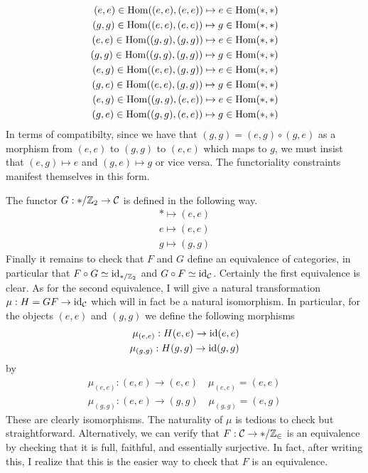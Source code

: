 \documentclass[12pt]{article}
\begin{document}
\begin{align*}
    (e,e)\in \operatorname{Hom}((e,e),(e,e)) \mapsto e \in \operatorname{Hom}(*,*) \\
    (g,g)\in \operatorname{Hom}((e,e),(e,e)) \mapsto g \in \operatorname{Hom}(*,*) \\
    (e,e)\in \operatorname{Hom}((g,g),(g,g)) \mapsto e \in \operatorname{Hom}(*,*) \\
    (g,g)\in \operatorname{Hom}((g,g),(g,g)) \mapsto g \in \operatorname{Hom}(*,*) \\
    (e,g)\in \operatorname{Hom}((e,e),(g,g)) \mapsto e \in \operatorname{Hom}(*,*) \\
    (g,e)\in \operatorname{Hom}((e,e),(g,g)) \mapsto g \in \operatorname{Hom}(*,*) \\
    (e,g)\in \operatorname{Hom}((g,g),(e,e)) \mapsto e \in \operatorname{Hom}(*,*) \\
    (g,e)\in \operatorname{Hom}((g,g),(e,e)) \mapsto g \in \operatorname{Hom}(*,*)
\end{align*} In terms of compatibilty, since we have that $(g,g) = (e,g) \circ (g,e)$ as a morphism from $(e,e)$ to $(g,g)$ to $(e,e)$ which maps to $g$, we must insist that $(e,g) \mapsto e $ and $(g,e) \mapsto g$ or vice versa. The functoriality constraints manifest themselves in this form.

The functor $G:*/\mathbb{Z}_2 \to \cal C$ is defined in the following way. \begin{align*}
    * \mapsto (e,e) \\
    e \mapsto (e,e) \\
    g \mapsto (g,g)
\end{align*} Finally it remains to check that $F$ and $G$ define an equivalence of categories, in particular that $F \circ G \simeq \text{id}_{*/\mathbb{Z}_2}$ and $G \circ F \simeq \text{id}_{\cal C}$. Certainly the first equivalence is clear. As for the second equivalence, I will give a natural transformation $\mu: H = GF \to \text{id}_{\cal C}$ which will in fact be a natural isomorphism. In particular, for the objects $(e,e)$ and $(g,g)$ we define the following morphisms \begin{align*}
    \mu_{(e,e)}: H(e,e) \to \operatorname{id}(e,e) \\
    \mu_{(g,g)}: H(g,g) \to \operatorname{id}(g,g)
\end{align*} by \begin{align*}
    \mu_{(e,e)}: (e,e) \to (e,e) \quad \mu_{(e,e)} = (e,e) \\
    \mu_{(g,g)}: (e,e) \to (g,g) \quad \mu_{(g,g)} = (e,g)
\end{align*} These are clearly isomorphisms. The naturality of $\mu$ is tedious to check but straightforward. Alternatively, we can verify that $F: \cal C \to */\mathbb{Z}_2$ is an equivalence by checking that it is full, faithful, and essentially surjective. In fact, after writing this, I realize that this is the easier way to check that $F$ is an equivalence.
\end{document}

